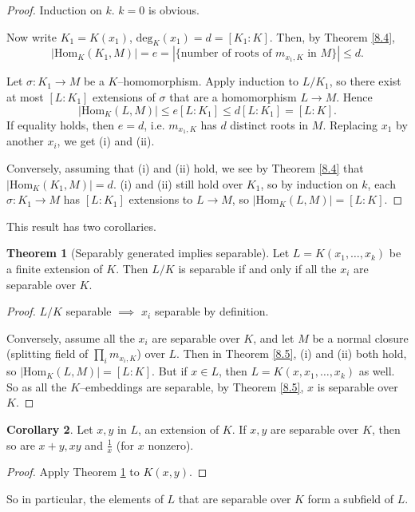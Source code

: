 \documentclass{article}
\theoremstyle{definition}
\newtheorem{theorem}{Theorem}[section]
\newtheorem{cor}[theorem]{Corollary}
\begin{document}
\begin{proof}
    Induction on $k$. $k=0$ is obvious.
    
    Now write $K_1=K(x_1)$, $\text{deg}_{K}(x_1) = d = [K_1 : K]$. Then, by Theorem \ref{8.4}, $$|\text{Hom}_K(K_1,M)| = e = |\{\text{number of roots of }m_{x_1,K} \text{ in } M\}| \le d.$$
    
    Let $\sigma : K_1 \to M$ be a $K$--homomorphism. Apply induction to $L/K_1$, so there exist at most $[L : K_1]$ extensions of $\sigma$ that are a homomorphism $L \to M$. Hence
    \[
    |\text{Hom}_K(L,M)| \le e [L:K_1] \le d[L:K_1] = [L:K].
    \]
    If equality holds, then $e=d$, i.e. $m_{x_1,K}$ has $d$ distinct roots in $M$. Replacing $x_1$ by another $x_i$, we get (i) and (ii).
    \vspace{1mm}
    
    Conversely, assuming that (i) and (ii) hold, we see by Theorem \ref{8.4} that $|\text{Hom}_K(K_1,M)|=d$. (i) and (ii) still hold over $K_1$, so by induction on $k$, each $\sigma : K_1 \to M$ has $[L:K_1]$ extensions to $L \to M$, so $|\text{Hom}_K(L,M)|=[L:K]$.
\end{proof}
This result has two corollaries.
\begin{theorem}[Separably generated implies separable]\label{8.6}
    Let $L=K(x_1,\ldots,x_k)$ be a finite extension of $K$. Then $L/K$ is separable if and only if all the $x_i$ are separable over $K$.
\end{theorem}
\begin{proof}
    $L/K$ separable $\implies $ $x_i$ separable by definition.
    \vspace{1mm}
    
    Conversely, assume all the $x_i$ are separable over $K$, and let $M$ be a normal closure (splitting field of $\prod_{i}^{} m_{x_i,K}$) over $L$. Then in Theorem \ref{8.5}, (i) and (ii) both hold, so $|\text{Hom}_K(L,M)|=[L:K]$. But if $x \in L$, then $L = K(x,x_1,\ldots,x_k)$ as well. So as all the $K$--embeddings are separable, by Theorem \ref{8.5}, $x$ is separable over $K$.
\end{proof}
\begin{cor}
    Let $x,y$ in $L$, an extension of $K$. If $x,y$ are separable over $K$, then so are $x+y,xy$ and $\frac{1}{x}$ (for $x$ nonzero).
\end{cor}
\begin{proof}
    Apply Theorem \ref{8.6} to $K(x,y)$.
\end{proof}
So in particular, the elements of $L$ that are separable over $K$ form a subfield of $L$.
\end{document}
